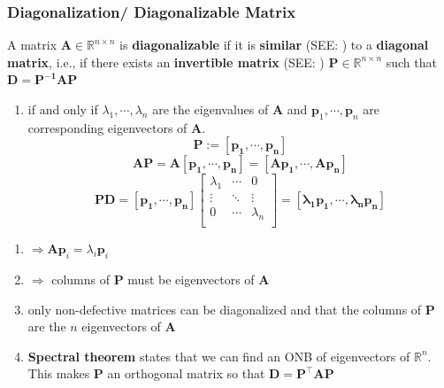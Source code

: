 
\subsubsection{Diagonalization/ Diagonalizable Matrix \cite{mfml-1}} \label{Diagonalization/ Diagonalizable Matrix}

A matrix $\mathbf{A} \in \mathbb{R}^{n\times n}$ is \textbf{diagonalizable} if it is \textbf{similar} (SEE: ) to a \textbf{diagonal matrix}, i.e., if there exists an \textbf{invertible matrix} (SEE: ) $\mathbf{P} \in \mathbb{R}^{n\times n}$ such that $\mathbf{D = P^{-1}AP}$

\begin{enumerate}
    \item if and only if $\lambda_1, \cdots , \lambda_n$ are the eigenvalues of $\mathbf{A}$ and $\mathbf{p}_1, \cdots , \mathbf{p}_n$ are corresponding eigenvectors of $\mathbf{A}$.
\[
    \mathbf{P := [p_1, \cdots , p_n]}
\]
\[
    \mathbf{AP = A[p_1, \cdots , p_n] = [Ap_1, \cdots , Ap_n]}
\]
\[
    \mathbf{PD} = \mathbf{[p_1, \cdots , p_n]}\begin{bmatrix}
        \lambda_1 & \cdots & 0 \\
        \vdots & \ddots & \vdots \\
        0 & \cdots & \lambda_n \\
    \end{bmatrix} = \mathbf{[\lambda_1 p_1, \cdots ,\lambda_n p_n]}
\]
    
\end{enumerate}
\begin{enumerate}
    \item[] $\Rightarrow \mathbf{Ap}_i = \lambda_i \mathbf{p}_i$

    \item[] $\Rightarrow$ columns of $\mathbf{P}$ must be eigenvectors of $\mathbf{A}$

    \item only non-defective matrices can be diagonalized and that the columns of $\mathbf{P}$ are the $n$ eigenvectors of $\mathbf{A}$

    \item \textbf{Spectral theorem} states that we can find an ONB of eigenvectors of $\mathbb{R}^n$. This makes $\mathbf{P}$ an orthogonal matrix so that $\mathbf{D = P^\top AP}$
\end{enumerate}


